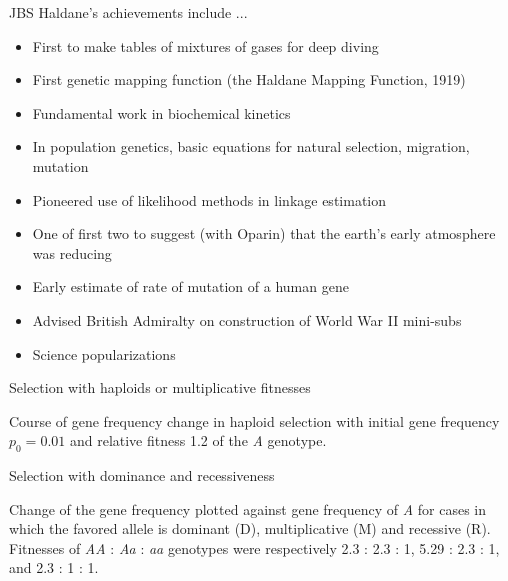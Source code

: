 \documentclass[bluish,slideColor,colorBG,pdf]{prosper}
\begin{document}
\begin{slide}[Replace]{JBS Haldane's achievements include ... }

\begin{itemize}
\item First to make tables of mixtures of gases for deep diving
\item First genetic mapping function (the Haldane Mapping Function, 1919)
\item Fundamental work in biochemical kinetics
\item In population genetics, basic equations for natural selection, migration, mutation
\item Pioneered use of likelihood methods in linkage estimation
\item One of first two to suggest (with Oparin) that the earth's early atmosphere was reducing
\item Early estimate of rate of mutation of a human gene
\item Advised British Admiralty on construction of World War II mini-subs
\item Science popularizations
\end{itemize}

\end{slide}

\begin{slide}[Replace]{Selection with haploids or multiplicative fitnesses}

\centerline{}

\begin{center}
\parbox[t]{3.5in}{
Course of gene frequency change in haploid selection with initial
gene frequency $p_0  =  0.01$ and relative fitness 1.2 of the {\it A}
genotype.
}
\end{center}

\end{slide}

\begin{slide}[Replace]{Selection with dominance and recessiveness}

\centerline{}

\begin{center}
\parbox[t]{3.5in}{
Change of the gene frequency plotted against gene frequency of {\it A} for
cases in which the favored allele is dominant (D), multiplicative (M) and
recessive (R).  Fitnesses of 
{\it AA} : {\it Aa} : {\it aa} genotypes were respectively 2.3 : 2.3 : 1,  5.29
: 2.3 : 1, and 2.3 : 1 : 1.
}
\end{center}

\end{slide}
\end{document}
